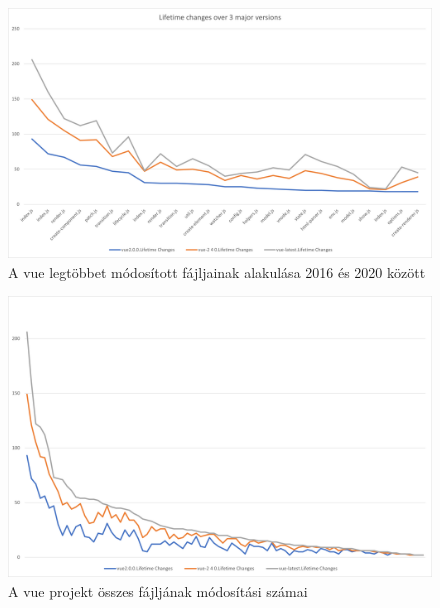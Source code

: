 \begin{figure}[H]
    \centering
    \includegraphics[width=1\textwidth]{images/vue/vue-all-lifetime-changes.png}
    \caption{A vue legtöbbet módosított fájljainak alakulása 2016 és 2020 között}
    \label{fig:vue-all-top-files}
\end{figure}

\begin{figure}[H]
    \centering
    \includegraphics[width=1\textwidth]{images/vue/vue-all-lifetime-changes-comp-full.png}
    \caption{A vue projekt összes fájljának módosítási számai}
    \label{fig:vue-all-files-lifetime-changes}
\end{figure}

